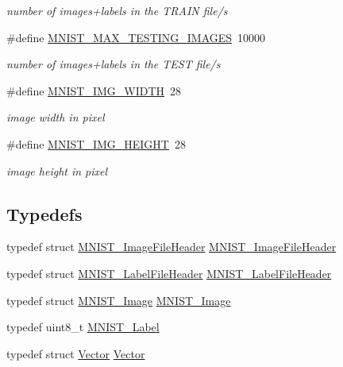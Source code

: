 \begin{DoxyCompactItemize}
\begin{DoxyCompactList}\small\item\em number of images+labels in the T\+R\+A\+I\+N file/s \end{DoxyCompactList}\item 
\#define \hyperlink{mnist-utils_8h_a4fc27b25f2ac15c55c99bdf4c59f2410}{M\+N\+I\+S\+T\+\_\+\+M\+A\+X\+\_\+\+T\+E\+S\+T\+I\+N\+G\+\_\+\+I\+M\+A\+G\+E\+S}~10000
\begin{DoxyCompactList}\small\item\em number of images+labels in the T\+E\+S\+T file/s \end{DoxyCompactList}\item 
\#define \hyperlink{mnist-utils_8h_afa9a8f034b6b2dbc4f42ec4281cf2082}{M\+N\+I\+S\+T\+\_\+\+I\+M\+G\+\_\+\+W\+I\+D\+T\+H}~28
\begin{DoxyCompactList}\small\item\em image width in pixel \end{DoxyCompactList}\item 
\#define \hyperlink{mnist-utils_8h_a50bba24c079fe75bbae294ba50dbaa32}{M\+N\+I\+S\+T\+\_\+\+I\+M\+G\+\_\+\+H\+E\+I\+G\+H\+T}~28
\begin{DoxyCompactList}\small\item\em image height in pixel \end{DoxyCompactList}\end{DoxyCompactItemize}
\subsection*{Typedefs}
\begin{DoxyCompactItemize}
\item 
typedef struct \hyperlink{struct_m_n_i_s_t___image_file_header}{M\+N\+I\+S\+T\+\_\+\+Image\+File\+Header} \hyperlink{mnist-utils_8h_ab159c22eb44132d35b9c25d1d23875e9}{M\+N\+I\+S\+T\+\_\+\+Image\+File\+Header}
\item 
typedef struct \hyperlink{struct_m_n_i_s_t___label_file_header}{M\+N\+I\+S\+T\+\_\+\+Label\+File\+Header} \hyperlink{mnist-utils_8h_a5445804de6d58a3726ff543cd3cf1cdb}{M\+N\+I\+S\+T\+\_\+\+Label\+File\+Header}
\item 
typedef struct \hyperlink{struct_m_n_i_s_t___image}{M\+N\+I\+S\+T\+\_\+\+Image} \hyperlink{mnist-utils_8h_ac86380de7c7c685ea8e992a27f671239}{M\+N\+I\+S\+T\+\_\+\+Image}
\item 
typedef uint8\+\_\+t \hyperlink{mnist-utils_8h_ac563f2337f8e23f2dcc095e41c138bfa}{M\+N\+I\+S\+T\+\_\+\+Label}
\item 
typedef struct \hyperlink{struct_vector}{Vector} \hyperlink{mnist-utils_8h_a3feb986d187bdc63289fddab34c9cca0}{Vector}
\end{DoxyCompactItemize}
